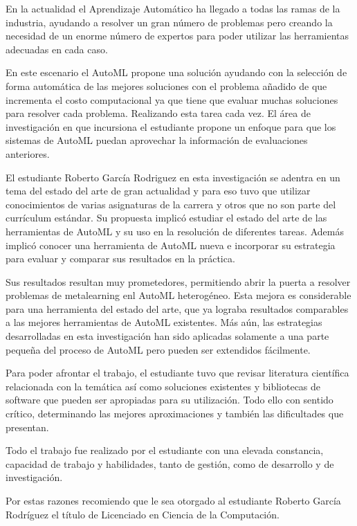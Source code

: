 \begin{opinion}
    En la actualidad el Aprendizaje Automático ha llegado a todas las ramas de
    la industria, ayudando a resolver un gran número de problemas pero creando
    la necesidad de un enorme número de expertos para poder utilizar las
    herramientas adecuadas en cada caso.

    En este escenario el AutoML propone una solución ayudando con la selección
    de forma automática de las mejores soluciones con el problema añadido de
    que incrementa el costo computacional ya que tiene que evaluar muchas
    soluciones para resolver cada problema. Realizando esta tarea cada vez.
    El área de investigación en que incursiona el estudiante propone un enfoque
    para que los sistemas de AutoML puedan aprovechar la información de
    evaluaciones anteriores.

    El  estudiante Roberto García Rodriguez en esta investigación se adentra
    en un tema del estado del arte de gran actualidad y para eso tuvo que
    utilizar conocimientos de varias asignaturas de la carrera y otros que no
    son parte del currículum estándar. Su propuesta implicó estudiar el estado
    del arte de las herramientas de AutoML y su uso en la resolución de
    diferentes tareas. Además implicó conocer una herramienta de AutoML nueva
    e incorporar su estrategia para evaluar y comparar sus resultados en la
    práctica.

    Sus resultados resultan muy prometedores,  permitiendo abrir la puerta a
    resolver problemas de metalearning enl AutoML heterogéneo. Esta mejora es
    considerable para una herramienta del estado del arte, que ya lograba
    resultados comparables a las mejores herramientas de AutoML existentes.
    Más aún, las estrategias desarrolladas en esta investigación han sido
    aplicadas solamente a una parte pequeña del proceso de 
    AutoML pero pueden ser extendidos fácilmente.

    Para poder afrontar el trabajo, el estudiante tuvo que revisar literatura
    científica relacionada con la temática así como soluciones existentes y
    bibliotecas de software que pueden ser apropiadas para su utilización.
    Todo ello con sentido crítico, determinando las mejores aproximaciones y
    también las dificultades que presentan.

    Todo el trabajo fue realizado por el estudiante con una elevada constancia,
    capacidad de trabajo y habilidades, tanto de gestión, como de desarrollo y 
    de investigación.

    Por estas razones recomiendo que le sea otorgado al estudiante Roberto
    García Rodríguez el título de Licenciado en Ciencia de la Computación.

    \begingroup
        \centering
    \endgroup

\end{opinion}